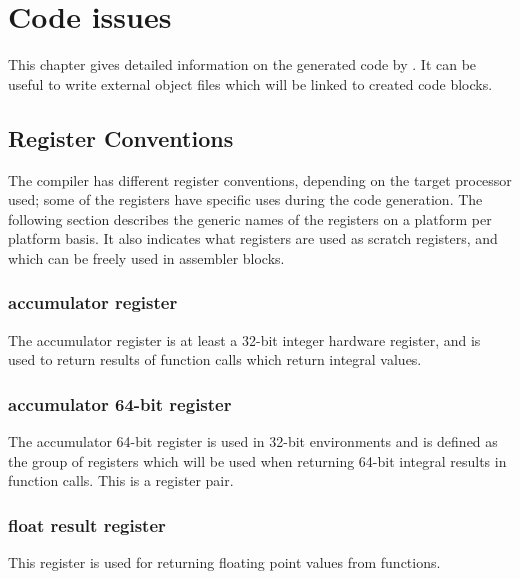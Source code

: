 \chapter{Code issues}
\label{ch:Code}

This chapter gives detailed information on the generated code by
\fpc. It can be useful to write external object files which will
be linked to \fpc created code blocks.

\section{Register Conventions}
\label{se:RegConvs}

The compiler has different register conventions, depending on the
target processor used; some of the registers have specific uses
during the code generation. The following section describes the
generic names of the registers on a platform per platform basis. It
also indicates what registers are used as scratch registers, and
which can be freely used in assembler blocks.

\subsection{accumulator register}

The accumulator register is at least a 32-bit integer
hardware register, and is used to return results of
function calls which return integral values.

\subsection{accumulator 64-bit register}

The accumulator 64-bit register is used in 32-bit environments
and is defined as the group of registers which will be used when
returning 64-bit integral results in function calls. This is a
register pair.

\subsection{float result register}

This register is used for returning floating point values
from functions.


